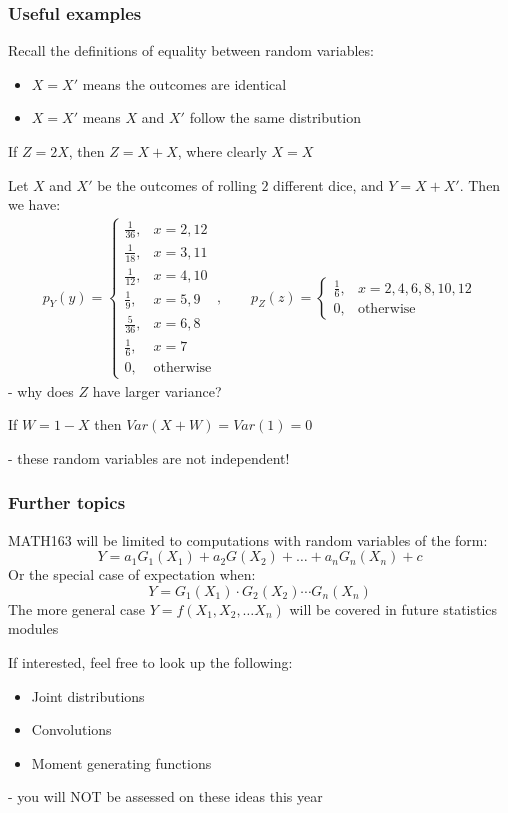 \documentclass[t,8pt]{beamer}%
\begin{document}
\begin{frame}
    \frametitle{Useful examples}
    Recall the definitions of equality between random variables:
    \begin{itemize}
        \item $X=X'$ means the outcomes are identical
        \item $X=X'$ means $X$ and $X'$ follow the same distribution
    \end{itemize}
    If $Z=2X$, then $Z=X+X$, where clearly $X=X$ \par
    Let $X$ and $X'$ be the outcomes of rolling $2$ different dice, and $Y=X+X'$. Then we have:
    \begin{eqnarray*}
        p_Y(y) = \left\{\begin{array}{lr}
		\frac 1{36}, & x=2,12\\
            \frac 1{18}, & x=3,11\\
            \frac 1{12}, & x=4,10\\
            \frac 1{9}, & x=5,9\\
            \frac 5{36}, & x=6,8\\
            \frac 1{6}, & x=7\\
			0, & \text{otherwise}
		\end{array}\right.,\qquad
        p_Z(z) = \left\{\begin{array}{lr}
		\frac 1{6}, & x=2,4,6,8,10,12\\
			0, & \text{otherwise}
		\end{array}\right.
    \end{eqnarray*}
    - why does $Z$ have larger variance? \par
    If $W=1-X$ then $Var(X+W)=Var(1)=0$ \par
    - these random variables are not independent!
\end{frame}

\begin{frame}
    \frametitle{Further topics}
    MATH163 will be limited to computations with random variables of the form:
    $$Y=a_1G_1(X_1)+a_2G(X_2)+\dots+a_nG_n(X_n)+c$$
    Or the special case of expectation when:
    $$Y=G_1(X_1)\cdot G_2(X_2)\cdots G_n(X_n)$$
    The more general case $Y=f(X_1,X_2,\dots X_n)$ will be covered in future statistics modules \par
    If interested, feel free to look up the following:
    \begin{itemize}
        \item Joint distributions
        \item Convolutions
        \item Moment generating functions
    \end{itemize}
    - you will NOT be assessed on these ideas this year
\end{frame}
\end{document}
